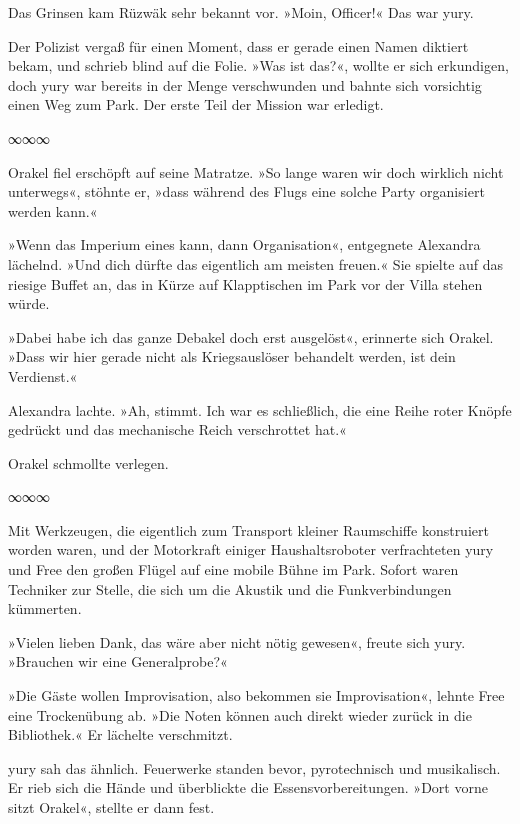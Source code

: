 Das Grinsen kam Rüzwäk sehr bekannt vor. »Moin, Officer!« Das war yury.

Der Polizist vergaß für einen Moment, dass er gerade einen Namen diktiert bekam, und schrieb blind  auf die Folie. »Was ist das?«, wollte er sich erkundigen, doch yury war bereits in der Menge verschwunden und bahnte sich vorsichtig einen Weg zum Park. Der erste Teil der Mission war erledigt.

\begin{center}
∞∞∞
\end{center}

Orakel fiel erschöpft auf seine Matratze. »So lange waren wir doch wirklich nicht unterwegs«, stöhnte er, »dass während des Flugs eine solche Party organisiert werden kann.«

»Wenn das Imperium eines kann, dann Organisation«, entgegnete Alexandra lächelnd. »Und dich dürfte das eigentlich am meisten freuen.« Sie spielte auf das riesige Buffet an, das in Kürze auf Klapptischen im Park vor der Villa stehen würde.

»Dabei habe ich das ganze Debakel doch erst ausgelöst«, erinnerte sich Orakel. »Dass wir hier gerade nicht als Kriegsauslöser behandelt werden, ist dein Verdienst.«

Alexandra lachte. »Ah, stimmt. Ich war es schließlich, die eine Reihe roter Knöpfe gedrückt und das mechanische Reich verschrottet hat.«

Orakel schmollte verlegen.

\begin{center}
∞∞∞
\end{center}

Mit Werkzeugen, die eigentlich zum Transport kleiner Raumschiffe konstruiert worden waren, und der Motorkraft einiger Haushaltsroboter verfrachteten yury und Free den großen Flügel auf eine mobile Bühne im Park. Sofort waren Techniker zur Stelle, die sich um die Akustik und die Funkverbindungen kümmerten.

»Vielen lieben Dank, das wäre aber nicht nötig gewesen«, freute sich yury. »Brauchen wir eine Generalprobe?«

»Die Gäste wollen Improvisation, also bekommen sie Improvisation«, lehnte Free eine Trockenübung ab. »Die Noten können auch direkt wieder zurück in die Bibliothek.« Er lächelte verschmitzt.

yury sah das ähnlich. Feuerwerke standen bevor, pyrotechnisch und musikalisch. Er rieb sich die Hände und überblickte die Essensvorbereitungen. »Dort vorne sitzt Orakel«, stellte er dann fest.

